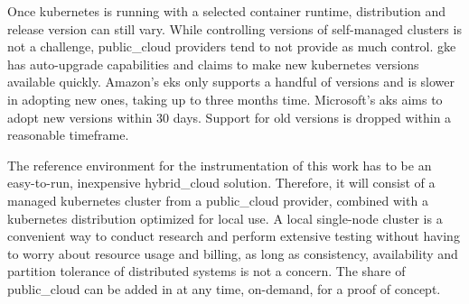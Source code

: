 \documentclass[../main.tex]{subfiles}
\begin{document}
    Once \gls{kubernetes} is running with a selected container runtime, distribution and release version can still vary.
    While controlling versions of self-managed clusters is not a challenge, \gls{public_cloud} providers tend to not provide as much control.
    \acrlong{gke} has auto-upgrade capabilities and claims to make new \gls{kubernetes} versions available quickly.
    Amazon's \acrlong{eks} only supports a handful of versions and is slower in adopting new ones, taking up to three months time.
    Microsoft's \acrlong{aks} aims to adopt new versions within 30 days.
    Support for old versions is dropped within a reasonable timeframe.\cite{k8s_offering_gke,k8s_v_aks,k8s_v_eks}

    The reference environment for the instrumentation of this work has to be an easy-to-run, inexpensive \gls{hybrid_cloud} solution.
    Therefore, it will consist of a managed \gls{kubernetes} cluster from a \gls{public_cloud} provider, combined with a \gls{kubernetes} distribution optimized for local use.
    A local single-node cluster is a convenient way to conduct research and perform extensive testing without having to worry about resource usage and billing, as long as consistency, availability and partition tolerance of distributed systems is not a concern.
    The share of \gls{public_cloud} can be added in at any time, on-demand, for a proof of concept.
\end{document}
